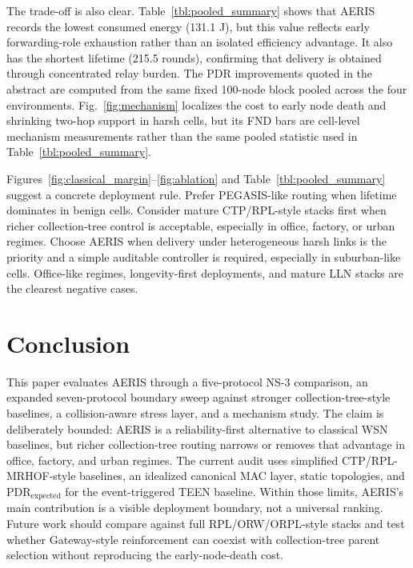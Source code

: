 \documentclass[conference]{IEEEtran}
\begin{document}
The trade-off is also clear. Table~\ref{tbl:pooled_summary} shows that AERIS records the lowest consumed energy (131.1 J), but this value reflects early forwarding-role exhaustion rather than an isolated efficiency advantage. It also has the shortest lifetime (215.5 rounds), confirming that delivery is obtained through concentrated relay burden. The PDR improvements quoted in the abstract are computed from the same fixed 100-node block pooled across the four environments. Fig.~\ref{fig:mechanism} localizes the cost to early node death and shrinking two-hop support in harsh cells, but its FND bars are cell-level mechanism measurements rather than the same pooled statistic used in Table~\ref{tbl:pooled_summary}.

Figures~\ref{fig:classical_margin}--\ref{fig:ablation} and Table~\ref{tbl:pooled_summary} suggest a concrete deployment rule. Prefer PEGASIS-like routing when lifetime dominates in benign cells. Consider mature CTP/RPL-style stacks first when richer collection-tree control is acceptable, especially in office, factory, or urban regimes. Choose AERIS when delivery under heterogeneous harsh links is the priority and a simple auditable controller is required, especially in suburban-like cells. Office-like regimes, longevity-first deployments, and mature LLN stacks are the clearest negative cases.

\section{Conclusion}
This paper evaluates AERIS through a five-protocol NS-3 comparison, an expanded seven-protocol boundary sweep against stronger collection-tree-style baselines, a collision-aware stress layer, and a mechanism study. The claim is deliberately bounded: AERIS is a reliability-first alternative to classical WSN baselines, but richer collection-tree routing narrows or removes that advantage in office, factory, and urban regimes. The current audit uses simplified CTP/RPL-MRHOF-style baselines, an idealized canonical MAC layer, static topologies, and $\mathrm{PDR}_{\mathrm{expected}}$ for the event-triggered TEEN baseline. Within those limits, AERIS's main contribution is a visible deployment boundary, not a universal ranking. Future work should compare against full RPL/ORW/ORPL-style stacks and test whether Gateway-style reinforcement can coexist with collection-tree parent selection without reproducing the early-node-death cost.

\FloatBarrier


\end{document}
